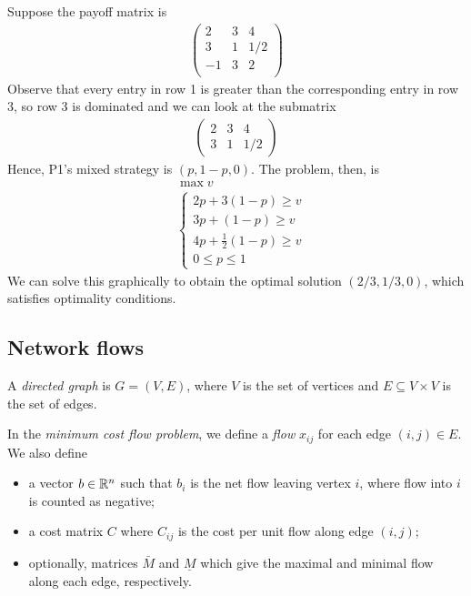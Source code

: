 \documentclass{../../template/note}
\begin{document}
    \begin{example*}
        Suppose the payoff matrix is
        \begin{align*}
            \begin{pmatrix}
                2 & 3 & 4 \\
                3 & 1 & 1/2 \\
                -1 & 3 & 2 \\
            \end{pmatrix}
        \end{align*}
        Observe that every entry in row 1 is greater than the corresponding entry in row 3, so row 3 is dominated and we can look at the submatrix
        \begin{align*}
            \begin{pmatrix}
                2 & 3 & 4 \\
                3 & 1 & 1/2
            \end{pmatrix}
        \end{align*}
        Hence, P1's mixed strategy is $(p, 1-p, 0)$. The problem, then, is
        \begin{align*}
            &\max v \\
            &\begin{cases}
                2p + 3(1-p) \geq v \\
                3p + (1-p) \geq v \\
                4p + \frac 1 2 (1-p) \geq v \\
                0 \leq p \leq 1
            \end{cases}
        \end{align*}
        We can solve this graphically to obtain the optimal solution $(2/3, 1/3, 0)$, which satisfies optimality conditions.       
    \end{example*}
    
    \subsection{Network flows}

    \begin{definition}
        A \emph{directed graph} is $G = (V, E)$, where $V$ is the set of vertices and $E \subseteq V \times V$ is the set of edges.
    \end{definition}
    
    In the \emph{minimum cost flow problem}, we define a \emph{flow} $x_{ij}$ for each edge $(i, j) \in E$. We also define
    \begin{itemize}
        \item a vector $b \in \mathbb R^n$ such that $b_i$ is the net flow leaving vertex $i$, where flow into $i$ is counted as negative;
        \item a cost matrix $C$ where $C_{ij}$ is the cost per unit flow along edge $(i, j)$;
        \item optionally, matrices $\bar M$ and $\underline M$ which give the maximal and minimal flow along each edge, respectively.
    \end{itemize}
    
\end{document}
